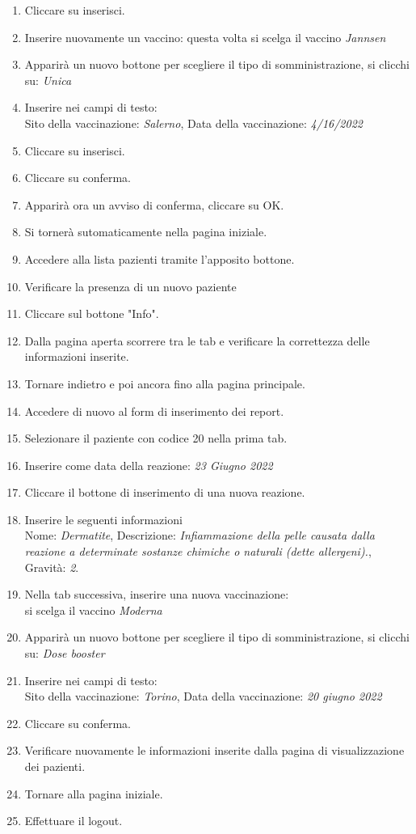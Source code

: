 \documentclass{article}
\begin{document}
\begin{enumerate}
        \item Cliccare su inserisci.
        \item Inserire nuovamente un vaccino: questa volta si scelga il vaccino \textit{Jannsen}
        \item Apparirà un nuovo bottone per scegliere il tipo di somministrazione, si clicchi su: \textit{Unica}
        \item Inserire nei campi di testo:\\
            Sito della vaccinazione: \textit{Salerno}, Data della vaccinazione: \textit{4/16/2022}
        \item Cliccare su inserisci.
        \item Cliccare su conferma.
        \item Apparirà ora un avviso di conferma, cliccare su OK.
        \item Si tornerà sutomaticamente nella pagina iniziale. 
        \item Accedere alla lista pazienti tramite l'apposito bottone.
        \item Verificare la presenza di un nuovo paziente
        \item Cliccare sul bottone "Info".
        \item Dalla pagina aperta scorrere tra le tab e verificare la correttezza delle informazioni inserite.
        \item Tornare indietro e poi ancora fino alla pagina principale.
        \item Accedere di nuovo al form di inserimento dei report.
        \item Selezionare il paziente con codice 20 nella prima tab.
        \item Inserire come data della reazione: \textit{23 Giugno 2022}
        \item Cliccare il bottone di inserimento di una nuova reazione.
        \item Inserire le seguenti informazioni\\ 
                Nome: \textit{Dermatite}, Descrizione: \textit{Infiammazione della pelle causata dalla reazione a determinate sostanze chimiche o naturali (dette allergeni).}, Gravità: \textit{2}.
        \item Nella tab successiva, inserire una nuova vaccinazione:\\
            si scelga il vaccino \textit{Moderna}
        \item Apparirà un nuovo bottone per scegliere il tipo di somministrazione, si clicchi su: \textit{Dose booster}
        \item Inserire nei campi di testo:\\
            Sito della vaccinazione: \textit{Torino}, Data della vaccinazione: \textit{20 giugno 2022}
        \item Cliccare su conferma.
        \item Verificare nuovamente le informazioni inserite dalla pagina di visualizzazione dei pazienti.
        \item Tornare alla pagina iniziale.
        \item Effettuare il logout.
    \end{enumerate}
\end{document}

